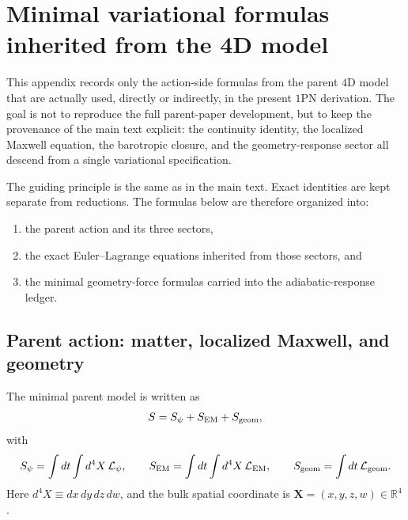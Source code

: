 \documentclass[11pt]{article}
\begin{document}
\section{Minimal variational formulas inherited from the 4D model}
\label{app:variational}

This appendix records only the action-side formulas from the parent \(4\)D model that are
actually used, directly or indirectly, in the present \(1\)PN derivation. The goal is not
to reproduce the full parent-paper development, but to keep the provenance of the main
text explicit: the continuity identity, the localized Maxwell equation, the barotropic
closure, and the geometry-response sector all descend from a single variational
specification.

The guiding principle is the same as in the main text. Exact identities are kept separate
from reductions. The formulas below are therefore organized into:
\begin{enumerate}[leftmargin=1.5em]
  \item the parent action and its three sectors,
  \item the exact Euler--Lagrange equations inherited from those sectors, and
  \item the minimal geometry-force formulas carried into the adiabatic-response ledger.
\end{enumerate}

\subsection{Parent action: matter, localized Maxwell, and geometry}
\label{app:variational-action}

The minimal parent model is written as
\begin{equation}
S = S_\psi + S_{\rm EM} + S_{\rm geom},
\label{eq:app-total-action}
\end{equation}
with
\begin{equation}
S_\psi = \int dt \int d^4X\, \mathcal L_\psi,
\qquad
S_{\rm EM} = \int dt \int d^4X\, \mathcal L_{\rm EM},
\qquad
S_{\rm geom} = \int dt\, \mathcal L_{\rm geom}.
\label{eq:app-sector-actions}
\end{equation}
Here \(d^4X\equiv dx\,dy\,dz\,dw\), and the bulk spatial coordinate is
\(\mathbf X=(x,y,z,w)\in\mathbb R^4\).
\end{document}
